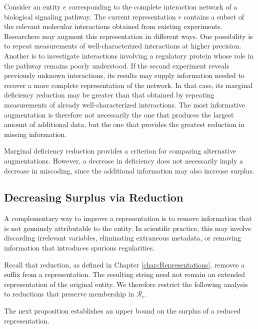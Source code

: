 \begin{example}
Consider an entity $e$ corresponding to the complete interaction network of a biological signaling pathway. The current representation $r$ contains a subset of the relevant molecular interactions obtained from existing experiments. Researchers may augment this representation in different ways. One possibility is to repeat measurements of well-characterized interactions at higher precision. Another is to investigate interactions involving a regulatory protein whose role in the pathway remains poorly understood. If the second experiment reveals previously unknown interactions, its results may supply information needed to recover a more complete representation of the network. In that case, its marginal deficiency reduction may be greater than that obtained by repeating measurements of already well-characterized interactions. The most informative augmentation is therefore not necessarily the one that produces the largest amount of additional data, but the one that provides the greatest reduction in missing information.
\end{example}

Marginal deficiency reduction provides a criterion for comparing alternative augmentations. However, a decrease in deficiency does not necessarily imply a decrease in miscoding, since the additional information may also increase surplus.


\subsection*{Decreasing Surplus via Reduction}

A complementary way to improve a representation is to remove information that is not genuinely attributable to the entity. In scientific practice, this may involve discarding irrelevant variables, eliminating extraneous metadata, or removing information that introduces spurious regularities.

Recall that reduction, as defined in Chapter \ref{chap:Representations}, removes a suffix from a representation. The resulting string need not remain an extended representation of the original entity. We therefore restrict the following analysis to reductions that preserve membership in $\mathcal R_e$.

The next proposition establishes an upper bound on the surplus of a reduced representation.

